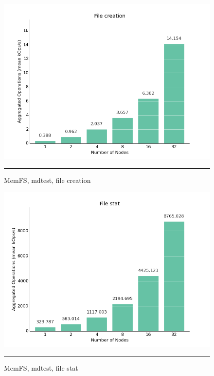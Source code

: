 \begin{figure}[H]
  \centering
    \includegraphics[scale=0.6]{Figures/memfs_mdtest_create.png}
    \rule{25em}{0.5pt}
  \caption[MemFS, mdtest, file creation]{MemFS, mdtest, file creation}
  \label{fig:plot5}
\end{figure}

\begin{figure}[H]
  \centering
    \includegraphics[scale=0.6]{Figures/memfs_mdtest_stat.png}
    \rule{25em}{0.5pt}
  \caption[MemFS, mdtest, file stat]{MemFS, mdtest, file stat}
  \label{fig:plot6}
\end{figure}

